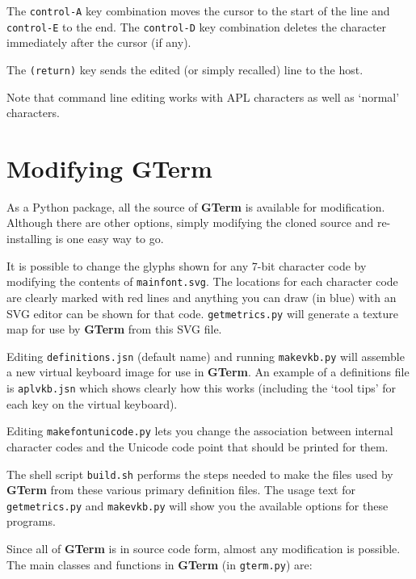 \documentclass[a4paper,twoside,11pt]{article}
\newcommand{\newpara}{\par\vspace{4mm}\noindent}
\begin{document}
\newpara
The \texttt{control-A} key combination moves the cursor to the start of the line and \texttt{control-E} to the end.
The \texttt{control-D} key combination deletes the character immediately after the cursor (if any).

\newpara
The \texttt{(return)} key sends the edited (or simply recalled) line to the host.

\newpara
Note that command line editing works with APL characters as well as `normal' characters.

\section{Modifying \textbf{GTerm}}
As a Python package, all the source of \textbf{GTerm} is available for modification. Although there are other
options, simply modifying the cloned source and re-installing is one easy way to go.
\newpara
It is possible to change the glyphs shown for any 7-bit character code by modifying the contents of
\texttt{mainfont.svg}. The locations for each character code are clearly marked with red lines and 
anything you can draw (in blue) with an SVG editor can be shown for that code. \texttt{getmetrics.py} will generate
a texture map for use by \textbf{GTerm} from this SVG file.
\newpara
Editing \texttt{definitions.jsn} (default name) and running \texttt{makevkb.py} will assemble a new virtual keyboard image for
use in \textbf{GTerm}. An example of a definitions file is \texttt{aplvkb.jsn} which shows clearly how this works (including the
`tool tips' for each key on the virtual keyboard).
\newpara
Editing \texttt{makefontunicode.py} lets you change the association between internal character codes and the Unicode
code point that should be printed for them.
\newpara
The shell script \texttt{build.sh} performs the steps needed to make the files used by \textbf{GTerm} from these various primary
definition files. The usage text for \texttt{getmetrics.py} and \texttt{makevkb.py} will show you the available options
for these programs.
\newpara
Since all of \textbf{GTerm} is in source code form, almost any modification is possible. The main classes and functions in
\textbf{GTerm} (in \texttt{gterm.py}) are:
\end{document}
